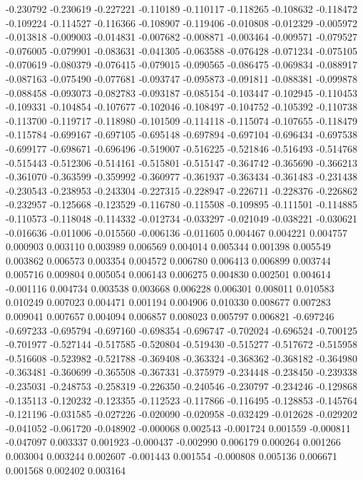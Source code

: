 -0.230792
-0.230619
-0.227221
-0.110189
-0.110117
-0.118265
-0.108632
-0.118472
-0.109224
-0.114527
-0.116366
-0.108907
-0.119406
-0.010808
-0.012329
-0.005972
-0.013818
-0.009003
-0.014831
-0.007682
-0.008871
-0.003464
-0.009571
-0.079527
-0.076005
-0.079901
-0.083631
-0.041305
-0.063588
-0.076428
-0.071234
-0.075105
-0.070619
-0.080379
-0.076415
-0.079015
-0.090565
-0.086475
-0.069834
-0.088917
-0.087163
-0.075490
-0.077681
-0.093747
-0.095873
-0.091811
-0.088381
-0.099878
-0.088458
-0.093073
-0.082783
-0.093187
-0.085154
-0.103447
-0.102945
-0.110453
-0.109331
-0.104854
-0.107677
-0.102046
-0.108497
-0.104752
-0.105392
-0.110738
-0.113700
-0.119717
-0.118980
-0.101509
-0.114118
-0.115074
-0.107655
-0.118479
-0.115784
-0.699167
-0.697105
-0.695148
-0.697894
-0.697104
-0.696434
-0.697538
-0.699177
-0.698671
-0.696496
-0.519007
-0.516225
-0.521846
-0.516493
-0.514768
-0.515443
-0.512306
-0.514161
-0.515801
-0.515147
-0.364742
-0.365690
-0.366213
-0.361070
-0.363599
-0.359992
-0.360977
-0.361937
-0.363434
-0.361483
-0.231438
-0.230543
-0.238953
-0.243304
-0.227315
-0.228947
-0.226711
-0.228376
-0.226862
-0.232957
-0.125668
-0.123529
-0.116780
-0.115508
-0.109895
-0.111501
-0.114885
-0.110573
-0.118048
-0.114332
-0.012734
-0.033297
-0.021049
-0.038221
-0.030621
-0.016636
-0.011006
-0.015560
-0.006136
-0.011605
0.004467
0.004221
0.004757
0.000903
0.003110
0.003989
0.006569
0.004014
0.005344
0.001398
0.005549
0.003862
0.006573
0.003354
0.004572
0.006780
0.006413
0.006899
0.003744
0.005716
0.009804
0.005054
0.006143
0.006275
0.004830
0.002501
0.004614
-0.001116
0.004734
0.003538
0.003668
0.006228
0.006301
0.008011
0.010583
0.010249
0.007023
0.004471
0.001194
0.004906
0.010330
0.008677
0.007283
0.009041
0.007657
0.004094
0.006857
0.008023
0.005797
0.006821
-0.697246
-0.697233
-0.695794
-0.697160
-0.698354
-0.696747
-0.702024
-0.696524
-0.700125
-0.701977
-0.527144
-0.517585
-0.520804
-0.519430
-0.515277
-0.517672
-0.515958
-0.516608
-0.523982
-0.521788
-0.369408
-0.363324
-0.368362
-0.368182
-0.364980
-0.363481
-0.360699
-0.365508
-0.367331
-0.375979
-0.234448
-0.238450
-0.239338
-0.235031
-0.248753
-0.258319
-0.226350
-0.240546
-0.230797
-0.234246
-0.129868
-0.135113
-0.120232
-0.123355
-0.112523
-0.117866
-0.116495
-0.128853
-0.145764
-0.121196
-0.031585
-0.027226
-0.020090
-0.020958
-0.032429
-0.012628
-0.029202
-0.041052
-0.061720
-0.048902
-0.000068
0.002543
-0.001724
0.001559
-0.000811
-0.047097
0.003337
0.001923
-0.000437
-0.002990
0.006179
0.000264
0.001266
0.003004
0.003244
0.002607
-0.001443
0.001554
-0.000808
0.005136
0.006671
0.001568
0.002402
0.003164
